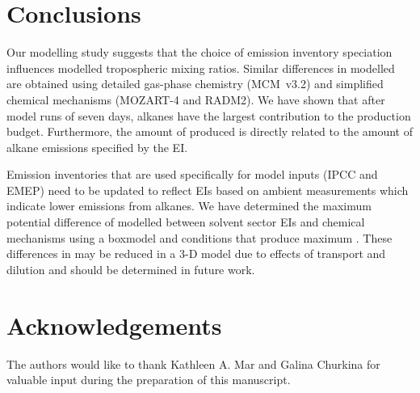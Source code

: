 \documentclass[14pt]{extarticle}
\begin{document}
%
%

\section{Conclusions}
Our modelling study suggests that the choice of emission inventory speciation influences modelled tropospheric  mixing ratios.
Similar differences in modelled  are obtained using detailed gas-phase chemistry (MCM~v3.2) and simplified chemical mechanisms (MOZART-4 and RADM2).
We have shown that after model runs of seven days, alkanes have the largest contribution to the  production budget.
Furthermore, the amount of  produced is directly related to the amount of alkane emissions specified by the EI.

Emission inventories that are used specifically for model inputs (IPCC and EMEP) need to be updated to reflect EIs based on ambient measurements which indicate lower emissions from alkanes.
We have determined the maximum potential difference of modelled  between solvent sector EIs and chemical mechanisms using a boxmodel and  conditions that produce maximum . 
These differences in  may be reduced in a 3-D model due to effects of transport and dilution and should be determined in future work.

\section*{Acknowledgements}
The authors would like to thank Kathleen A. Mar and Galina Churkina for valuable input during the preparation of this manuscript.


 
\end{document}
